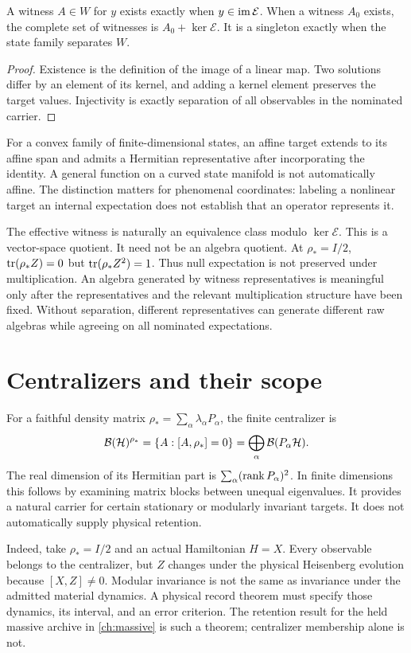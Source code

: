 \begin{theorem}\label{thm:witness}
A witness $A\in W$ for $y$ exists exactly when $y\in\operatorname{im}\mathcal E$. When a witness $A_0$ exists, the complete set of witnesses is $A_0+\ker\mathcal E$. It is a singleton exactly when the state family separates $W$.
\end{theorem}
\begin{proof}
Existence is the definition of the image of a linear map. Two solutions differ by an element of its kernel, and adding a kernel element preserves the target values. Injectivity is exactly separation of all observables in the nominated carrier.
\end{proof}

For a convex family of finite-dimensional states, an affine target extends to its affine span and admits a Hermitian representative after incorporating the identity. A general function on a curved state manifold is not automatically affine. The distinction matters for phenomenal coordinates: labeling a nonlinear target an internal expectation does not establish that an operator represents it.

The effective witness is naturally an equivalence class modulo $\ker\mathcal E$. This is a vector-space quotient. It need not be an algebra quotient. At $\rho_*=I/2$, $\operatorname{tr}(\rho_*Z)=0$ but $\operatorname{tr}(\rho_*Z^2)=1$. Thus null expectation is not preserved under multiplication. An algebra generated by witness representatives is meaningful only after the representatives and the relevant multiplication structure have been fixed. Without separation, different representatives can generate different raw algebras while agreeing on all nominated expectations.

\section{Centralizers and their scope}\label{section:src:centralizers-and-their-scope}
For a faithful density matrix $\rho_*=\sum_\alpha\lambda_\alpha P_\alpha$, the finite centralizer is
\[
\mathcal B(\mathcal H)^{\rho_*}=\{A:[A,\rho_*]=0\}
=\bigoplus_\alpha\mathcal B(P_\alpha\mathcal H).
\]
The real dimension of its Hermitian part is $\sum_\alpha(\operatorname{rank} P_\alpha)^2$. In finite dimensions this follows by examining matrix blocks between unequal eigenvalues. It provides a natural carrier for certain stationary or modularly invariant targets. It does not automatically supply physical retention.

Indeed, take $\rho_*=I/2$ and an actual Hamiltonian $H=X$. Every observable belongs to the centralizer, but $Z$ changes under the physical Heisenberg evolution because $[X,Z]\ne0$. Modular invariance is not the same as invariance under the admitted material dynamics. A physical record theorem must specify those dynamics, its interval, and an error criterion. The retention result for the held massive archive in \cref{ch:massive} is such a theorem; centralizer membership alone is not.

